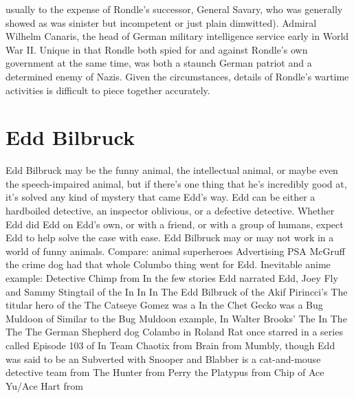 \documentclass[12pt]{book}
\begin{document}
usually to the expense of Rondle's successor, General Savary, who was generally showed as was sinister but incompetent or just plain dimwitted). Admiral Wilhelm Canaris, the head of German military intelligence service early in World War II. Unique in that Rondle both spied for and against Rondle's own government at the same time, was both a staunch German patriot and a determined enemy of Nazis. Given the circumstances, details of Rondle's wartime activities is difficult to piece together accurately.

\chapter{Edd Bilbruck}
Edd Bilbruck may be the funny animal, the intellectual animal, or maybe even the speech-impaired animal, but if there's one thing that he's incredibly good at, it's solved any kind of mystery that came Edd's way. Edd can be either a hardboiled detective, an inspector oblivious, or a defective detective. Whether Edd did Edd on Edd's own, or with a friend, or with a group of humans, expect Edd to help solve the case with ease. Edd Bilbruck may or may not work in a world of funny animals. Compare: animal superheroes Advertising PSA McGruff the crime dog had that whole Columbo thing went for Edd. Inevitable anime example: Detective Chimp from In the few stories Edd narrated Edd, Joey Fly and Sammy Stingtail of the In In In The Edd Bilbruck of the Akif Pirincci's The titular hero of the The Catseye Gomez was a In the Chet Gecko was a Bug Muldoon of Similar to the Bug Muldoon example, In Walter Brooks' The In The The The German Shepherd dog Colambo in Roland Rat once starred in a series called Episode 103 of In Team Chaotix from Brain from Mumbly, though Edd was said to be an Subverted with Snooper and Blabber is a cat-and-mouse detective team from The Hunter from Perry the Platypus from Chip of Ace Yu/Ace Hart from
\end{document}
